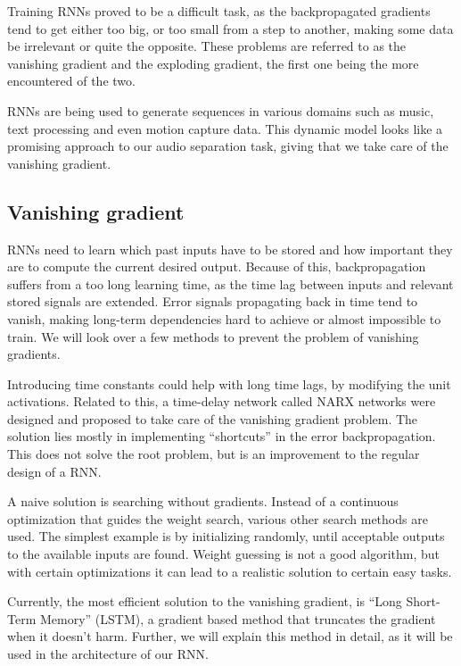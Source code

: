 \documentclass[../Thesis.tex]{subfiles}
\begin{document}
Training RNNs proved to be a difficult task, as the backpropagated gradients tend to get either too big, or too small from a step to another, making some data be irrelevant or quite the opposite. These problems are referred to as the vanishing gradient and the exploding gradient, the first one being the more encountered of the two.

RNNs are being used to generate sequences in various domains such as music, text processing and even motion capture data. This dynamic model looks like a promising approach to our audio separation task, giving that we take care of the vanishing gradient.

\subsection {Vanishing gradient}

RNNs need to learn which past inputs have to be stored and how important they are to compute the current desired output. Because of this, backpropagation suffers from a too long learning time, as the time lag between inputs and relevant stored signals are extended. Error signals propagating back in time tend to vanish, making long-term dependencies hard to achieve or almost impossible to train. We will look over a few methods to prevent the problem of vanishing gradients.

Introducing time constants could help with long time lags, by modifying the unit activations. Related to this, a time-delay network called NARX networks were designed and proposed to take care of the vanishing gradient problem. The solution lies mostly in implementing “shortcuts” in the error backpropagation. This does not solve the root problem, but is an improvement to the regular design of a RNN.

A naive solution is searching without gradients. Instead of a continuous optimization that guides the weight search, various other search methods are used. The simplest example is by initializing randomly, until acceptable outputs to the available inputs are found. Weight guessing is not a good algorithm, but with certain optimizations it can lead to a realistic solution to certain easy tasks.  

Currently, the most efficient solution to the vanishing gradient, is “Long Short-Term Memory” (LSTM), a gradient based method that truncates the gradient when it doesn’t harm. Further, we will explain this method in detail, as it will be used in the architecture of our RNN. 
\end{document}
